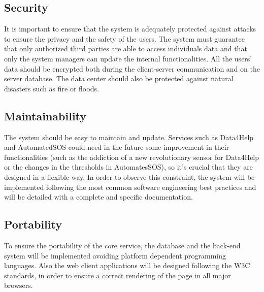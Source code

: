 \subsection{Security}
It is important to ensure that the system is adequately protected against attacks to ensure the privacy and the safety of the users.
The system must guarantee that only authorized third parties are able to access individuals data and that only the system managers can update the internal functionalities.
All the users' data should be encrypted both during the client-server communication and on the server database.
The data center should also be protected against natural disasters such as fire or floods. 

\subsection{Maintainability}
The system should be easy to maintain and update. Services such as Data4Help and AutomatedSOS could need in the future some improvement in their functionalities (such as the addiction of a new revolutionary sensor for Data4Help or the changes in the thresholds in AutomatesSOS), so it's crucial that they are designed in a flexible way.
In order to observe this constraint, the system will be implemented following the most common software engineering best practices and will be detailed with a complete and specific documentation.

\subsection{Portability}
To ensure the portability of the core service, the database and the back-end system will be implemented avoiding platform dependent programming languages.
Also the web client applications will be designed following the W3C standards, in order to ensure a correct rendering of the page in all major browsers.